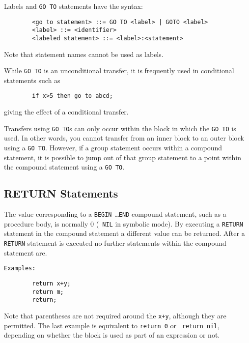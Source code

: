 Labels and {\tt GO TO} statements have the syntax:
\begin{verbatim}
        <go to statement> ::= GO TO <label> | GOTO <label>
        <label> ::= <identifier>
        <labeled statement> ::= <label>:<statement>
\end{verbatim}
Note that statement names cannot be used as labels.

While {\tt GO TO} is an unconditional transfer, it is frequently used
in conditional statements such as
\begin{verbatim}
        if x>5 then go to abcd;
\end{verbatim}
giving the effect of a conditional transfer.

Transfers using {\tt GO TO}s can only occur within the block in which the
{\tt GO TO} is used.  In other words, you cannot transfer from an inner
block to an outer block using a {\tt GO TO}.  However, if a group statement
occurs within a compound statement, it is possible to jump out of that group
statement to a point within the compound statement using a {\tt GO TO}.

\subsection{RETURN Statements}

The value corresponding to a {\tt BEGIN \ldots END} compound statement,
 such as a procedure body, is normally 0 ({\tt
NIL} in symbolic mode).  By executing a {\tt RETURN}
statement in the compound statement a different value can be returned.
After a {\tt RETURN} statement is executed no further statements within
the compound statement are.

{\tt Examples:}
\begin{verbatim}
        return x+y;
        return m;
        return;
\end{verbatim}
Note that parentheses are not required around the {\tt x+y}, although they
are permitted.  The last example is equivalent to {\tt return 0} or {\tt
return nil}, depending on whether the block is used as part of an
expression or not.

